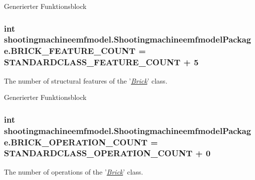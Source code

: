 Generierter Funktionsblock  \hypertarget{interfaceshootingmachineemfmodel_1_1_shootingmachineemfmodel_package_aa6135c0087ddefa4bda2cd529937b4bf}{
\subsubsection[{B\-R\-I\-C\-K\-\_\-\-F\-E\-A\-T\-U\-R\-E\-\_\-\-C\-O\-U\-N\-T}]{\setlength{\rightskip}{0pt plus 5cm}int shootingmachineemfmodel.\-Shootingmachineemfmodel\-Package.\-B\-R\-I\-C\-K\-\_\-\-F\-E\-A\-T\-U\-R\-E\-\_\-\-C\-O\-U\-N\-T = {\bf S\-T\-A\-N\-D\-A\-R\-D\-C\-L\-A\-S\-S\-\_\-\-F\-E\-A\-T\-U\-R\-E\-\_\-\-C\-O\-U\-N\-T} + 5}}\label{interfaceshootingmachineemfmodel_1_1_shootingmachineemfmodel_package_aa6135c0087ddefa4bda2cd529937b4bf}
The number of structural features of the '{\itshape \hyperlink{interfaceshootingmachineemfmodel_1_1_brick}{Brick}}' class.

Generierter Funktionsblock  \hypertarget{interfaceshootingmachineemfmodel_1_1_shootingmachineemfmodel_package_a1c0b9ea1c59e43a9df5e05458d39e1fa}{
\subsubsection[{B\-R\-I\-C\-K\-\_\-\-O\-P\-E\-R\-A\-T\-I\-O\-N\-\_\-\-C\-O\-U\-N\-T}]{\setlength{\rightskip}{0pt plus 5cm}int shootingmachineemfmodel.\-Shootingmachineemfmodel\-Package.\-B\-R\-I\-C\-K\-\_\-\-O\-P\-E\-R\-A\-T\-I\-O\-N\-\_\-\-C\-O\-U\-N\-T = {\bf S\-T\-A\-N\-D\-A\-R\-D\-C\-L\-A\-S\-S\-\_\-\-O\-P\-E\-R\-A\-T\-I\-O\-N\-\_\-\-C\-O\-U\-N\-T} + 0}}\label{interfaceshootingmachineemfmodel_1_1_shootingmachineemfmodel_package_a1c0b9ea1c59e43a9df5e05458d39e1fa}
The number of operations of the '{\itshape \hyperlink{interfaceshootingmachineemfmodel_1_1_brick}{Brick}}' class.


